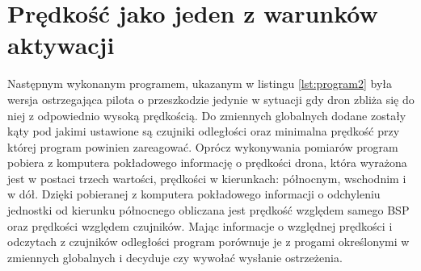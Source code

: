 \documentclass[a4paper,12pt]{book}
\begin{document}
        \section{Prędkość jako jeden z warunków aktywacji}
        Następnym wykonanym programem, ukazanym w listingu \ref{lst:program2} była wersja ostrzegająca pilota o przeszkodzie jedynie w sytuacji gdy dron zbliża się do niej z odpowiednio wysoką prędkością. Do zmiennych globalnych dodane zostały kąty 
        pod jakimi ustawione są czujniki odległości oraz minimalna prędkość przy której program powinien zareagować. Oprócz wykonywania pomiarów program pobiera z komputera pokładowego informację o prędkości drona, która 
        wyrażona jest w postaci trzech wartości, prędkości w kierunkach: północnym, wschodnim i w dół. Dzięki pobieranej z komputera pokładowego informacji o 
        odchyleniu jednostki od kierunku północnego  obliczana jest prędkość względem samego BSP oraz prędkości względem czujników. Mając informacje o względnej prędkości i odczytach z czujników odległości program porównuje je z progami określonymi w zmiennych globalnych 
        i decyduje czy wywołać wysłanie ostrzeżenia.
\end{document}
